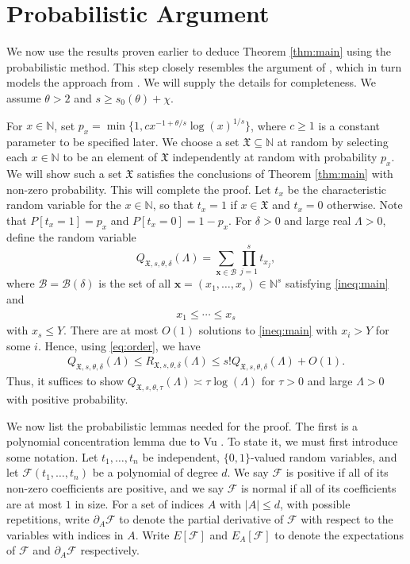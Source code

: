 \documentclass[11pt,reqno]{amsart}
\numberwithin{equation}{section}
\begin{document}
\section{Probabilistic Argument} \label{sec:prob}
We now use the results proven earlier to deduce Theorem \ref{thm:main} using the probabilistic method. This step closely resembles the argument of \cite{WoolThin}, which in turn models the approach from \cite{VuRef}. We will supply the details for completeness. We assume $\theta > 2$ and $s \geq s_0(\theta)+\chi$. 

For $x \in \mathbb{N}$, set $p_x = \min\{1, cx^{-1+\theta/s}\log(x)^{1/s} \}$, where $c \geq 1$ is a constant parameter to be specified later. We choose a set $\mathfrak{X} \subseteq \mathbb{N}$ at random by selecting each $x \in \mathbb{N}$ to be an element of $\mathfrak{X}$ independently at random with probability $p_x$. We will show such a set $\mathfrak{X}$ satisfies the conclusions of Theorem \ref{thm:main} with non-zero probability. This will complete the proof. Let $t_x$ be the characteristic random variable for the $x \in \mathbb{N}$, so that $t_x = 1$ if $x \in \mathfrak{X}$ and $t_x = 0$ otherwise. Note that $P[t_x= 1] = p_x$ and $P[t_x = 0] = 1-p_x$. For $\delta > 0$ and large real $\Lambda > 0$, define the random variable 
\[ Q_{\mathfrak{X},s,\theta, \delta}(\Lambda) = \sum_{\mathbf{x} \in \mathcal{B}} \prod_{j=1}^s t_{x_j}, \]
where $\mathcal{B} = \mathcal{B}(\delta)$ is the set of all $\mathbf{x} = (x_1,\ldots,x_s) \in \mathbb{N}^s$ satisfying \eqref{ineq:main} and 
\begin{align} \label{eq:order}
x_1 \leq \cdots \leq x_s 
\end{align}
with $x_s \leq Y$. 
There are at most  $O(1)$ solutions to \eqref{ineq:main} with $x_i > Y$ for some $i$. Hence, using \eqref{eq:order}, we have 
\begin{align} \label{eq:ordersandwich}
Q_{\mathfrak{X},s,\theta, \delta}(\Lambda) \leq R_{\mathfrak{X},s,\theta,\delta}(\Lambda) \leq s!Q_{\mathfrak{X},s,\theta, \delta}(\Lambda)+O(1). 
\end{align}
Thus, it suffices to show $Q_{\mathfrak{X},s,\theta, \tau}(\Lambda) \asymp \tau\log(\Lambda)$ for $\tau > 0$ and large $\Lambda > 0$ with positive probability. 

We now list the probabilistic lemmas needed for the proof. The first is a polynomial concentration lemma due to Vu \cite{VuConc}. To state it, we must first introduce some notation. Let $t_1, \ldots, t_n$ be independent, $\{0,1\}$-valued random variables, and let $\mathcal{F}(t_1,\ldots,t_n)$ be a polynomial of degree $d$. We say $\mathcal{F}$ is positive if all of its non-zero coefficients are positive, and we say $\mathcal{F}$ is normal if all of its coefficients are at most $1$ in size. For a set of indices $A$ with $|A| \leq d$, with possible repetitions, write $\partial_A\mathcal{F}$ to denote the partial derivative of $\mathcal{F}$ with respect to the variables with indices in $A$. Write $E[\mathcal{F}]$ and $E_A[\mathcal{F}]$ to denote the expectations of $\mathcal{F}$ and $\partial_A \mathcal{F}$ respectively.  
\end{document}
